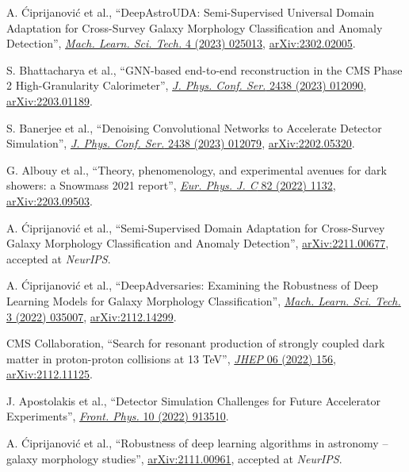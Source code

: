 \begin{description}[leftmargin=12pt,font=\normalfont,labelsep=0em]
\item A. \'Ciprijanovi\'c et al., ``DeepAstroUDA: Semi-Supervised Universal Domain Adaptation for Cross-Survey Galaxy Morphology Classification and Anomaly Detection'', \href{https://doi.org/10.1088/2632-2153/acca5f}{\emph{Mach. Learn. Sci. Tech.} 4 (2023) 025013}, \href{https://arxiv.org/abs/2302.02005}{arXiv:2302.02005}. %
\item S. Bhattacharya et al., ``GNN-based end-to-end reconstruction in the CMS Phase 2 High-Granularity Calorimeter'', \href{https://doi.org/10.1088/1742-6596/2438/1/012090}{\emph{J. Phys. Conf. Ser.} 2438 (2023) 012090}, \href{https://arxiv.org/abs/2203.01189}{arXiv:2203.01189}. %
\item S. Banerjee et al., ``Denoising Convolutional Networks to Accelerate Detector Simulation'', \href{https://doi.org/10.1088/1742-6596/2438/1/012079}{\emph{J. Phys. Conf. Ser.} 2438 (2023) 012079}, \href{https://arxiv.org/abs/2202.05320}{arXiv:2202.05320}. %
\item G. Albouy et al., ``Theory, phenomenology, and experimental avenues for dark showers: a Snowmass 2021 report'', \href{https://doi.org/10.1140/epjc/s10052-022-11048-8}{\emph{Eur. Phys. J. C} 82 (2022) 1132}, \href{https://arxiv.org/abs/2203.09503}{arXiv:2203.09503}. %
\ifdefined\longflag\item A. \'Ciprijanovi\'c et al., ``Semi-Supervised Domain Adaptation for Cross-Survey Galaxy Morphology Classification and Anomaly Detection'', \href{https://arxiv.org/abs/2211.00677}{arXiv:2211.00677}, accepted at \emph{NeurIPS}.\fi %
\item A. \'Ciprijanovi\'c et al., ``DeepAdversaries: Examining the Robustness of Deep Learning Models for Galaxy Morphology Classification'', \href{https://doi.org/10.1088/2632-2153/ac7f1a}{\emph{Mach. Learn. Sci. Tech.} 3 (2022) 035007}, \href{https://arxiv.org/abs/2112.14299}{arXiv:2112.14299}. %
\item CMS Collaboration, ``Search for resonant production of strongly coupled dark matter in proton-proton collisions at 13 TeV'', \href{https://doi.org/10.1007/JHEP06(2022)156}{\emph{JHEP} 06 (2022) 156}, \href{https://arxiv.org/abs/2112.11125}{arXiv:2112.11125}. %
\item J. Apostolakis et al., ``Detector Simulation Challenges for Future Accelerator Experiments'', \href{https://doi.org/10.3389/fphy.2022.913510}{\emph{Front. Phys.} 10 (2022) 913510}. %
\ifdefined\longflag\item A. \'Ciprijanovi\'c et al., ``Robustness of deep learning algorithms in astronomy -- galaxy morphology studies'', \href{https://arxiv.org/abs/2111.00961}{arXiv:2111.00961}, accepted at \emph{NeurIPS}. \fi %

\end{description}
